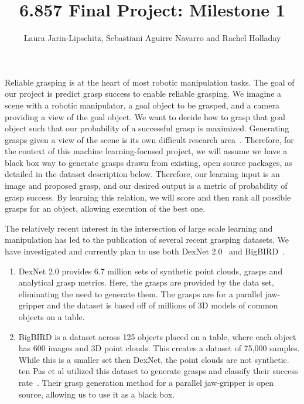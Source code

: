 \documentclass[letterpaper, 10 pt]{article}
\begin{document}
\title{6.857 Final Project: Milestone 1}
\author{Laura Jarin-Lipschitz, Sebastiani Aguirre Navarro and Rachel Holladay}
\maketitle

Reliable grasping is at the heart of most robotic manipulation tasks. 
The goal of our project is predict grasp success to enable reliable grasping. 
We imagine a scene with a robotic manipulator, a goal object to be grasped, and a camera providing a view of the goal object.
We want to decide how to grasp that goal object such that our probability of a successful grasp is maximized.
Generating grasps given a view of the scene is its own difficult research area~\cite{pinto2016supersizing,lenz2015deep,jiang2011efficient}.
Therefore, for the context of this machine learning-focused project, we will assume we have a black box way to generate grasps drawn from existing, open source packages, as detailed in the dataset description below.
Therefore, our learning input is an image and proposed grasp, and our desired output is a metric of probability of grasp success. 
By learning this relation, we will score and then rank all possible grasps for an object, allowing execution of the best one. 

The relatively recent interest in the intersection of large scale learning and manipulation has led to the publication of several recent grasping datasets. 
We have investigated and currently plan to use both DexNet 2.0~\cite{mahler2017dex} and BigBIRD~\cite{singh2014bigbird}. 
\begin{enumerate}
   \item DexNet 2.0 provides 6.7 million sets of synthetic point clouds, grasps and analytical grasp metrics. Here, the grasps are provided by the data set, eliminating the need to generate them. The grasps are for a parallel jaw-gripper and the dataset is based off of millions of 3D models of common objects on a table.  
   \item BigBIRD is a dataset across 125 objects placed on a table, where each object has 600 images and 3D point clouds. This creates a dataset of 75,000 samples. While this is a smaller set then DexNet, the point clouds are not synthetic. ten Pas et al utilized this dataset to generate grasps and classify their success rate~\cite{pas2017grasp}. Their grasp generation method for a parallel jaw-gripper is open source, allowing us to use it as a black box. 
\end{enumerate}
\end{document}
